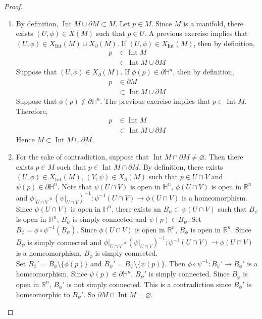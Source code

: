 \documentclass{book}
\theoremstyle{definition}
\renewcommand{\H}{\mathbb{H}}
\newcommand{\R}{\mathbb{R}}
\DeclareMathOperator{\Int}{Int}
\DeclareMathOperator*{\0}{\mbf{0}}
\DeclareMathOperator*{\1}{\mbf{1}}
\newcommand{\p}{\partial}
\begin{document}
	\begin{proof}\
		\begin{enumerate}
			\item By definition, $\Int M \cup \p M \subset M$. Let $p \in M$. Since $M$ is a manifold, there exists $(U, \phi) \in X(M)$ such that $p \in U$. A previous exercise implies that $(U, \phi) \in X_{\Int}(M) \cup X_{\p}(M)$. If $(U, \phi) \in X_{\Int}(M)$, then by definition, 
			\begin{align*}
				p 
				& \in \Int M \\
				& \subset \Int M \cup \p M
			\end{align*}        
			Suppose that $(U, \phi) \in X_{\p}(M)$. If $\phi(p) \in \p \H^n$, then by definition, 
			\begin{align*}
				p 
				& \in \p M \\
				& \subset \Int M \cup \p M
			\end{align*}   
			Suppose that $\phi(p) \not \in \p \H^n$. The previous exercise implies that $p \in \Int M$. Therefore, 
			\begin{align*}
				p 
				& \in \Int M \\
				& \subset \Int M \cup \p M
			\end{align*}        
			Hence $M \subset \Int M \cup \p M$.
			\item For the sake of contradiction, suppose that $\Int M \cap \p M \neq \varnothing$. Then there exists $p \in M$ such that $p \in \Int M \cap \p M$. By definition, there exists $(U, \phi) \in X_{\Int}(M)$, $(V, \psi) \in X_{\p}(M)$ such that $p \in U \cap V$ and $\psi(p) \in \p \H^n$. Note that $\psi(U \cap V)$ is open in $\H^n$, $\phi(U \cap V)$ is open in $\R^n$ and $\phi|_{U \cap V} \circ (\psi|_{U \cap V})^{-1}: \psi^{-1}(U \cap V) \rightarrow \phi(U \cap V)$ is a homeomorphism.\\ 
			Since $\psi(U \cap V)$ is open in $\H^n$, there exists an $B_{\psi} \subset \psi(U \cap V)$ such that $B_{\psi}$ is open in $\H^n$, $B_{\psi}$ is simply connected and $\psi(p) \in B_{\psi}$. Set $B_{\phi} = \phi \circ \psi^{-1}(B_{\psi})$. Since $\phi(U \cap V)$ is open in $\R^n$, $B_{\phi}$ is open in $\R^n$. Since $B_{\psi}$ is simply connected and $\phi|_{U \cap V} \circ (\psi|_{U \cap V})^{-1}: \psi^{-1}(U \cap V) \rightarrow \phi(U \cap V)$ is a homeomorphism, $B_{\phi}$ is simply connected. \\
			Set $B_{\phi}' = B_{\phi} \setminus \{\phi(p)\}$ and $B_{\psi}' = B_{\psi} \setminus \{\psi(p)\}$. Then $\phi \circ \psi^{-1}: B_{\psi}' \rightarrow B_{\phi}'$ is a homeomorphism. Since $\psi(p) \in \p \H^n$, $B_{\psi}'$ is simply connected. Since $B_{\phi}$ is open in $\R^n$, $B_{\phi}'$ is not simply connected. This is a contradiction since $B_{\phi}'$ is homeomorphic to $B_{\psi}'$. So $\p M \cap \Int M = \varnothing$. 
		\end{enumerate}
	\end{proof}
\end{document}
